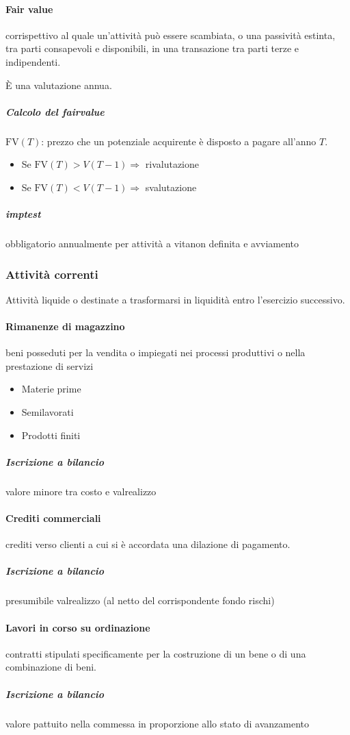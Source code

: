 \documentclass[10pt,a4paper,fleqn,oneside]{book}
\begin{document}
\paragraph{Fair value} corrispettivo al quale un'attività può essere scambiata,
o una passività estinta, tra parti consapevoli e disponibili, in una transazione
tra parti terze e indipendenti.

È una valutazione annua.

\subparagraph{Calcolo del \gls{fairvalue}}
$\text{FV}(T)$: prezzo che un potenziale acquirente è disposto a pagare all'anno $T$.
\begin{itemize}
    \item Se $\text{FV}(T) > V(T-1) \Rightarrow$ rivalutazione
    \item Se $\text{FV}(T) < V(T-1) \Rightarrow$ svalutazione
\end{itemize}

\subparagraph{\Gls{imptest}} obbligatorio annualmente per attività a vitanon definita e avviamento

\subsubsection{Attività correnti}
Attività liquide o destinate a trasformarsi in liquidità entro l’esercizio successivo.

\paragraph{Rimanenze di magazzino} beni posseduti per la vendita o impiegati nei
processi produttivi o nella prestazione di servizi
\begin{itemize}
    \item Materie prime
    \item Semilavorati
    \item Prodotti finiti
\end{itemize}

\subparagraph{Iscrizione a bilancio} valore minore tra \gls{costo} e \gls{valrealizzo}

\paragraph{Crediti commerciali} crediti verso clienti a cui si è accordata una dilazione di pagamento.
\subparagraph{Iscrizione a bilancio} presumibile \gls{valrealizzo} (al netto del corrispondente fondo rischi)

\paragraph{Lavori in corso su ordinazione} contratti stipulati specificamente per la costruzione di un bene o di una combinazione di beni.
\subparagraph{Iscrizione a bilancio} valore pattuito nella commessa in proporzione allo stato di avanzamento
\end{document}
